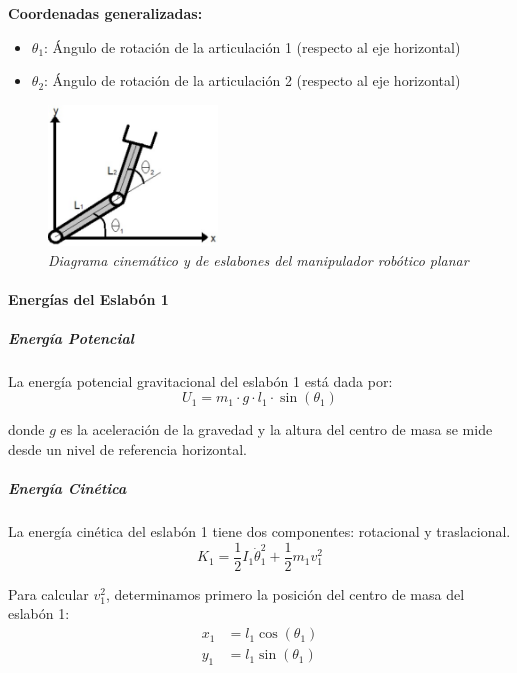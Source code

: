 \textbf{Coordenadas generalizadas:}
\begin{itemize}
    \item $\theta_1$: Ángulo de rotación de la articulación 1 (respecto al eje horizontal)
    \item $\theta_2$: Ángulo de rotación de la articulación 2 (respecto al eje horizontal)
\end{itemize}
\begin{figure}[H]
    \centering
    \includegraphics[width=0.4\textwidth]{img/DCL_brazo.png}
    \caption{\textit{Diagrama cinemático y de eslabones del manipulador robótico planar}}
    \label{fig:DCL_brazo}
\end{figure}
\paragraph{Energías del Eslabón 1}

\subparagraph{Energía Potencial}

La energía potencial gravitacional del eslabón 1 está dada por:
\begin{equation}
U_1 = m_1 \cdot g \cdot l_1 \cdot \sin(\theta_1)
\end{equation}

donde $g$ es la aceleración de la gravedad y la altura del centro de masa se mide desde un nivel de referencia horizontal.

\subparagraph{Energía Cinética}

La energía cinética del eslabón 1 tiene dos componentes: rotacional y traslacional.
\begin{equation}
K_1 = \frac{1}{2} I_1 \dot{\theta}_1^2 + \frac{1}{2} m_1 v_1^2
\end{equation}

Para calcular $v_1^2$, determinamos primero la posición del centro de masa del eslabón 1:
\begin{align}
x_1 &= l_1 \cos(\theta_1) \\
y_1 &= l_1 \sin(\theta_1)
\end{align}

